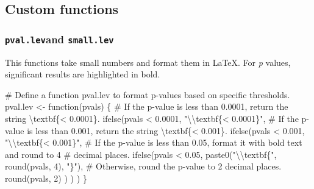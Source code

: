 \documentclass[
  bookmarksnumbered]{article}
\newenvironment{Shaded}{\begin{snugshade}}{\end{snugshade}}
\newcommand{\CommentTok}[1]{\textcolor[rgb]{0.50,0.62,0.50}{#1}}
\newcommand{\ControlFlowTok}[1]{\textcolor[rgb]{0.94,0.87,0.69}{#1}}
\newcommand{\DecValTok}[1]{\textcolor[rgb]{0.86,0.86,0.80}{#1}}
\newcommand{\FloatTok}[1]{\textcolor[rgb]{0.75,0.75,0.82}{#1}}
\newcommand{\FunctionTok}[1]{\textcolor[rgb]{0.94,0.94,0.56}{#1}}
\newcommand{\NormalTok}[1]{\textcolor[rgb]{0.80,0.80,0.80}{#1}}
\newcommand{\OtherTok}[1]{\textcolor[rgb]{0.94,0.94,0.56}{#1}}
\newcommand{\SpecialCharTok}[1]{\textcolor[rgb]{0.86,0.64,0.64}{#1}}
\newcommand{\StringTok}[1]{\textcolor[rgb]{0.80,0.58,0.58}{#1}}
\begin{document}
\subsection{Custom functions}\label{custom-functions}

\subsubsection{\texorpdfstring{\texttt{pval.lev}and \texttt{small.lev}}{pval.levand small.lev}}\label{pval.levand-small.lev}

This functions take small numbers and format them in \LaTeX. For \emph{p} values, significant results are highlighted in bold.

\begin{Shaded}
\begin{Highlighting}[]
\CommentTok{\# Define a function \textquotesingle{}pval.lev\textquotesingle{} to format p{-}values based on specific thresholds.}
\NormalTok{pval.lev }\OtherTok{\textless{}{-}} \ControlFlowTok{function}\NormalTok{(pvals) \{}
  \CommentTok{\# If the p{-}value is less than 0.0001, return the string \textquotesingle{}\textbackslash{}textbf\{\textless{} 0.0001\}\textquotesingle{}.}
  \FunctionTok{ifelse}\NormalTok{(pvals }\SpecialCharTok{\textless{}} \FloatTok{0.0001}\NormalTok{,}
    \StringTok{"}\SpecialCharTok{\textbackslash{}\textbackslash{}}\StringTok{textbf\{\textless{} 0.0001\}"}\NormalTok{,}
    \CommentTok{\# If the p{-}value is less than 0.001, return the string \textquotesingle{}\textbackslash{}textbf\{\textless{} 0.001\}\textquotesingle{}.}
    \FunctionTok{ifelse}\NormalTok{(pvals }\SpecialCharTok{\textless{}} \FloatTok{0.001}\NormalTok{,}
      \StringTok{"}\SpecialCharTok{\textbackslash{}\textbackslash{}}\StringTok{textbf\{\textless{} 0.001\}"}\NormalTok{,}
      \CommentTok{\# If the p{-}value is less than 0.05, format it with bold text and round to 4}
      \CommentTok{\# decimal places.}
      \FunctionTok{ifelse}\NormalTok{(pvals }\SpecialCharTok{\textless{}} \FloatTok{0.05}\NormalTok{,}
        \FunctionTok{paste0}\NormalTok{(}\StringTok{"}\SpecialCharTok{\textbackslash{}\textbackslash{}}\StringTok{textbf\{"}\NormalTok{, }\FunctionTok{round}\NormalTok{(pvals, }\DecValTok{4}\NormalTok{), }\StringTok{"\}"}\NormalTok{),}
        \CommentTok{\# Otherwise, round the p{-}value to 2 decimal places.}
        \FunctionTok{round}\NormalTok{(pvals, }\DecValTok{2}\NormalTok{)}
\NormalTok{      )}
\NormalTok{    )}
\NormalTok{  )}
\NormalTok{\}}



\end{Highlighting}
\end{Shaded}
\end{document}
